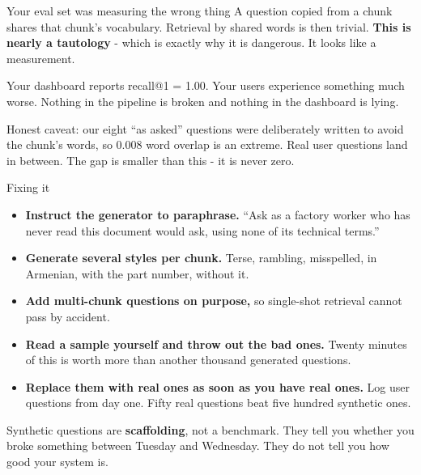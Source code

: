 \documentclass[aspectratio=169]{beamer}
\newcommand{\trapbox}[1]{%
  \begin{tcolorbox}[colback=armred!8, colframe=armred, boxrule=0.6pt, arc=2pt]
  #1
  \end{tcolorbox}}
\newcommand{\takebox}[1]{%
  \begin{tcolorbox}[colback=paramgreen!8, colframe=paramgreen, boxrule=0.6pt, arc=2pt]
  #1
  \end{tcolorbox}}
\begin{document}
\begin{frame}{Your eval set was measuring the wrong thing}
  \vspace{0.6em}
  A question copied from a chunk shares that chunk's vocabulary. Retrieval by shared words
  is then trivial. \textbf{This is nearly a tautology} - which is exactly why it is
  dangerous. It looks like a measurement.

  \vspace{0.9em}
  \trapbox{Your dashboard reports recall@1 = 1.00. Your users experience something much
  worse. Nothing in the pipeline is broken and nothing in the dashboard is lying.}

  \vspace{0.9em}
  \begin{center}
  {\small\color{gray}Honest caveat: our eight ``as asked'' questions were deliberately
  written to avoid the chunk's words, so 0.008 word overlap is an extreme. Real user
  questions land in between. The gap is smaller than this - it is never zero.}
  \end{center}
\end{frame}

\begin{frame}{Fixing it}
  \vspace{0.1em}
  \begin{itemize}
    \item \textbf{Instruct the generator to paraphrase.} ``Ask as a factory worker who has
      never read this document would ask, using none of its technical terms.''
    \item \textbf{Generate several styles per chunk.} Terse, rambling, misspelled, in
      Armenian, with the part number, without it.
    \item \textbf{Add multi-chunk questions on purpose,} so single-shot retrieval cannot
      pass by accident.
    \item \textbf{Read a sample yourself and throw out the bad ones.} Twenty minutes of
      this is worth more than another thousand generated questions.
    \item \textbf{Replace them with real ones as soon as you have real ones.} Log user
      questions from day one. Fifty real questions beat five hundred synthetic ones.
    \end{itemize}

  \vspace{0.1em}
  \takebox{Synthetic questions are \textbf{scaffolding}, not a benchmark. They tell you
  whether you broke something between Tuesday and Wednesday. They do not tell you how good
  your system is.}
\end{frame}
\end{document}
